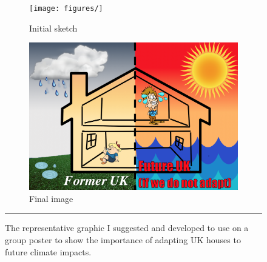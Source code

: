 \begin{figure}[htbp]
    \centering
        \begin{subfigure}{.48\textwidth}
          \centering
          \texttt{[image: figures/]}
          \caption{Initial sketch}
          \label{Sketch01}
        \end{subfigure}
        \begin{subfigure}{.485\textwidth}
          \centering
          \includegraphics[width=\textwidth]{figures/eposter_sketch_2.png}
          \caption{Final image}
          \label{Sketch02}
        \end{subfigure}
    \rule{\textwidth}{0.5pt} %
    \caption{The representative graphic I suggested and developed to use on a group poster to show the importance of adapting UK houses to future climate impacts.}
    \label{fig:Sketch}
\end{figure}